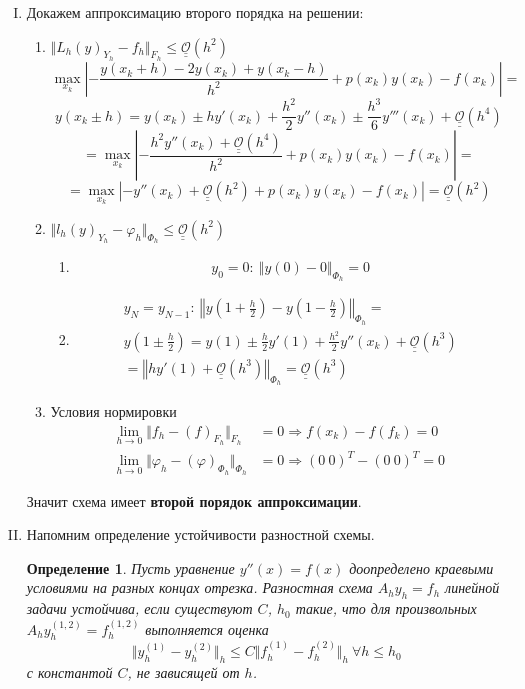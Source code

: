 \documentclass[12pt]{article}
\newtheorem*{definition}{Определение}
\def\bigO{ \underline{\underline{\mathcal{O}}} }
\begin{document}
    \newpage

    \begin{enumerate}[I.]
        \item Докажем аппроксимацию второго порядка на решении:
        \begin{enumerate}
            \item $\Vert L_h(y)_{Y_h}-f_h\Vert_{F_h}\leq\bigO(h^2)$
            \[\max_{x_k}\left|-\frac{y(x_k+h)-2y(x_k)+y(x_k-h)}{h^2}+p(x_k)y(x_k)-f(x_k)\right|=\]
            \[y(x_k\pm h)=y(x_k)\pm hy'(x_k)+\frac{h^2}{2}y''(x_k)\pm\frac{h^3}{6}y'''(x_k)+\bigO(h^4)\]
            \[=\max_{x_k}\left|-\frac{h^2y''(x_k)+\bigO(h^4)}{h^2}+p(x_k)y(x_k)-f(x_k)\right|=\]
            \[=\max_{x_k}\left|-y''(x_k)+\bigO(h^2)+p(x_k)y(x_k)-f(x_k)\right|=\bigO(h^2)\]
            \item $\Vert l_h(y)_{Y_h}-\varphi_h\Vert_{\Phi_h}\leq\bigO(h^2)$
            \begin{enumerate}
                \item \[y_0 = 0:\ \Vert y(0)-0\Vert_{\Phi_h}=0\]
                \item
                \begin{multline*}
                    y_N = y_{N-1}:\ \left\Vert y\left(1+\frac{h}{2}\right)-y\left(1-\frac{h}{2}\right)\right\Vert_{\Phi_h}= \\
                    y\left(1\pm \frac{h}{2}\right)=y(1)\pm \frac{h}{2}y'(1)+\frac{h^2}{2}y''(x_k)+\bigO(h^3) \\
                    =\left\Vert hy'(1)+\bigO(h^3)\right\Vert_{\Phi_h}=\bigO(h^3)
                \end{multline*}
            \end{enumerate}
            \item Условия нормировки
            \begin{align*}
                \lim_{h\rightarrow0}\Vert f_h-(f)_{F_h}\Vert_{F_h}&=0 \Rightarrow f(x_k)-f(f_k) = 0\\
                \lim_{h\rightarrow0}\Vert \varphi_h-(\varphi)_{\Phi_h}\Vert_{\Phi_h}&=0 \Rightarrow (0\ 0)^T - (0\ 0)^T = 0
            \end{align*}
        \end{enumerate}
        Значит схема имеет \textbf{второй порядок аппроксимации}.
        \newpage

        \item Напомним определение устойчивости разностной схемы.
        \begin{definition}
            Пусть уравнение $y''(x)=f(x)$ доопределено краевыми
            условиями на разных концах отрезка. Разностная схема
            $A_hy_h = f_h$ линейной задачи устойчива, если существуют $C$, $h_0$ такие, что для
            произвольных $A_hy^{(1,2)}_h = f^{(1,2)}_h$ выполняется оценка
            \[\Vert y^{(1)}_h-y^{(2)}_h\Vert_h\leq C\Vert f^{(1)}_h -f^{(2)}_h\Vert_h\ \forall h\leq h_0\]
            с константой $C$, не зависящей от $h$.
        \end{definition}


\end{enumerate}
\end{document}
